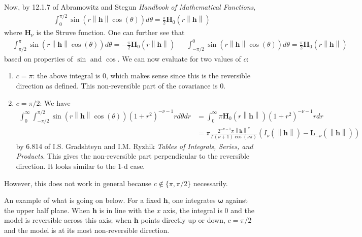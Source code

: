 \documentclass[11pt]{article}
\newcommand{\vint}{\boldsymbol{\omega}}
\begin{document}
 
Now, by 12.1.7 of Abramowitz and Stegun \textit{Handbook of Mathematical Functions}, 
\begin{align*}
 \int_0^{\pi/2}  \sin(r\left\lVert \boldsymbol{h}\right\rVert \cos(\theta)) d\theta= \frac{\pi}{2} \boldsymbol{H}_{0}(r\left\lVert \boldsymbol{h}\right\rVert) \end{align*}where $\boldsymbol{H}_\nu$ is the Struve function. One can further see that \begin{align*}
  &\int_{\pi/2}^\pi  \sin(r\left\lVert \boldsymbol{h}\right\rVert \cos(\theta)) d\theta= -\frac{\pi}{2} \boldsymbol{H}_{0}(r\left\lVert \boldsymbol{h}\right\rVert) &   &\int_{-\pi/2}^0  \sin(r\left\lVert \boldsymbol{h}\right\rVert \cos(\theta)) d\theta= \frac{\pi}{2} \boldsymbol{H}_{0}(r\left\lVert \boldsymbol{h}\right\rVert)
 \end{align*}based on properties of $\sin$ and $\cos$. We can now evaluate for two values of $c$:
 
 \begin{enumerate}
\item $c = \pi$: the above integral is $0$, which makes sense since this is the reversible direction as defined. This non-reversible part of the covariance is $0$.
\item $c = \pi/2$: We have \begin{align*}
 \int_0^\infty  \int_{-\pi/2}^{\pi/2} \sin(r\left\lVert \boldsymbol{h}\right\rVert \cos(\theta)) (1 +r^2)^{- \nu - 1} r d\theta dr&= \int_0^\infty \pi\boldsymbol{H}_0(r\left\lVert \boldsymbol{h}\right\rVert)(1 + r^2)^{-\nu - 1} r dr \\
& =\pi\frac{2^{-\nu -1} \pi \left\lVert \boldsymbol{h}\right\rVert^{\nu}}{\Gamma(\nu+1) \cos(\nu \pi)} \left( I_{\nu }(\left\lVert \boldsymbol{h}\right\rVert) - \boldsymbol{L}_{-\nu} (\left\lVert \boldsymbol{h}\right\rVert)\right)
\end{align*}by 6.814 of I.S. Gradshteyn and I.M. Ryzhik \textit{Tables of Integrals, Series, and Products}. This gives the non-reversible part perpendicular to the reversible direction. It looks similar to the 1-d case.
 \end{enumerate}
 
 However, this does not work in general because $c\notin \{\pi, \pi/2\}$ necessarily. 


An example of what is going on below. For a fixed $\boldsymbol{h}$, one integrates $\vint$ against the upper half plane. When $\boldsymbol{h}$ is in line with the $x$ axis, the integral is $0$ and the model is reversible across this axis; when $\boldsymbol{h}$ points directly up or down, $c= \pi/2$ and the model is at its most non-reversible direction.
\end{document}
